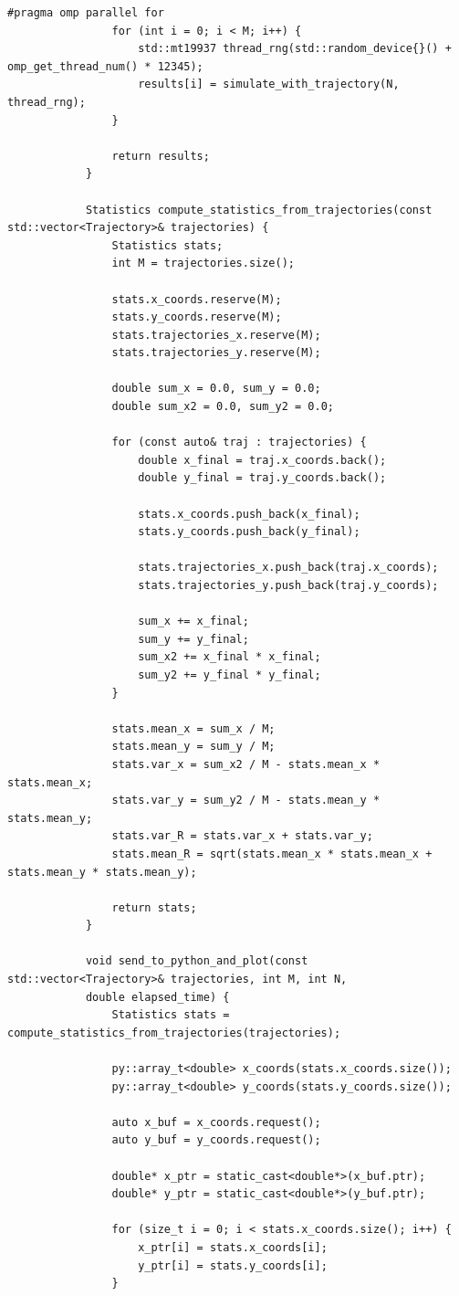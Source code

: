 \documentclass[14pt,a4paper]{extarticle}
\theoremstyle{plain}
\begin{document}
\begin{lstlisting}[title=main.cpp, gobble=16, breaklines=true, showspaces=false, showtabs=false, breakatwhitespace=true]
				#pragma omp parallel for
				for (int i = 0; i < M; i++) {
					std::mt19937 thread_rng(std::random_device{}() + omp_get_thread_num() * 12345);
					results[i] = simulate_with_trajectory(N, thread_rng);
				}
				
				return results;
			}
			
			Statistics compute_statistics_from_trajectories(const std::vector<Trajectory>& trajectories) {
				Statistics stats;
				int M = trajectories.size();
				
				stats.x_coords.reserve(M);
				stats.y_coords.reserve(M);
				stats.trajectories_x.reserve(M);
				stats.trajectories_y.reserve(M);
				
				double sum_x = 0.0, sum_y = 0.0;
				double sum_x2 = 0.0, sum_y2 = 0.0;
				
				for (const auto& traj : trajectories) {
					double x_final = traj.x_coords.back();
					double y_final = traj.y_coords.back();
					
					stats.x_coords.push_back(x_final);
					stats.y_coords.push_back(y_final);
					
					stats.trajectories_x.push_back(traj.x_coords);
					stats.trajectories_y.push_back(traj.y_coords);
					
					sum_x += x_final;
					sum_y += y_final;
					sum_x2 += x_final * x_final;
					sum_y2 += y_final * y_final;
				}
				
				stats.mean_x = sum_x / M;
				stats.mean_y = sum_y / M;
				stats.var_x = sum_x2 / M - stats.mean_x * stats.mean_x;
				stats.var_y = sum_y2 / M - stats.mean_y * stats.mean_y;
				stats.var_R = stats.var_x + stats.var_y;
				stats.mean_R = sqrt(stats.mean_x * stats.mean_x + stats.mean_y * stats.mean_y);
				
				return stats;
			}
			
			void send_to_python_and_plot(const std::vector<Trajectory>& trajectories, int M, int N,
			double elapsed_time) {
				Statistics stats = compute_statistics_from_trajectories(trajectories);
				
				py::array_t<double> x_coords(stats.x_coords.size());
				py::array_t<double> y_coords(stats.y_coords.size());
				
				auto x_buf = x_coords.request();
				auto y_buf = y_coords.request();
				
				double* x_ptr = static_cast<double*>(x_buf.ptr);
				double* y_ptr = static_cast<double*>(y_buf.ptr);
				
				for (size_t i = 0; i < stats.x_coords.size(); i++) {
					x_ptr[i] = stats.x_coords[i];
					y_ptr[i] = stats.y_coords[i];
				}
				

\end{lstlisting}
\end{document}
